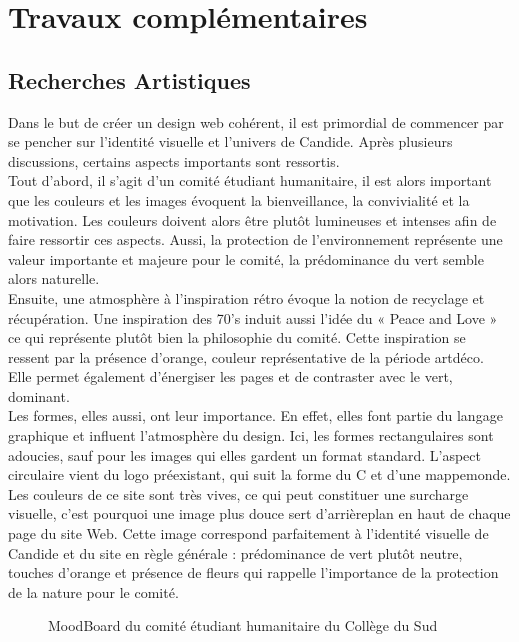 \documentclass[a4,10pt,french]{sphinxmanual}
\begin{document}
\section{Travaux complémentaires}
\label{\detokenize{chapitre-06:travaux-complementaires}}

\subsection{Recherches Artistiques}
\label{\detokenize{chapitre-06:recherches-artistiques}}
\sphinxAtStartPar
Dans le but de créer un design web cohérent, il est primordial de commencer par se pencher sur l’identité visuelle et l’univers de Candide. Après plusieurs discussions, certains aspects importants sont ressortis.\\
Tout d’abord, il s’agit d’un comité étudiant humanitaire, il est alors important que les couleurs et les images évoquent la bienveillance, la convivialité et la motivation. Les couleurs doivent alors être plutôt lumineuses et intenses afin de faire ressortir ces aspects. Aussi, la protection de l’environnement représente une valeur importante et majeure pour le comité, la prédominance du vert semble alors naturelle.\\
Ensuite, une atmosphère à l’inspiration rétro évoque la notion de recyclage et récupération. Une inspiration des 70’s induit aussi l’idée du « Peace and Love » ce qui représente plutôt bien la philosophie du comité. Cette inspiration se ressent par la présence d’orange, couleur représentative de la période art\sphinxhyphen{}déco. Elle permet également d’énergiser les pages et de contraster avec le vert, dominant.\\
Les formes, elles aussi, ont leur importance. En effet, elles font partie du langage graphique et influent l’atmosphère du design. Ici, les formes rectangulaires sont adoucies, sauf pour les images qui elles gardent un format standard. L’aspect circulaire vient du logo préexistant, qui suit la forme du C et d’une mappemonde.\\
Les couleurs de ce site sont très vives, ce qui peut constituer une surcharge visuelle, c’est pourquoi une image plus douce sert d’arrière\sphinxhyphen{}plan en haut de chaque page du site Web. Cette image correspond parfaitement à l’identité visuelle de Candide et du site en règle générale : prédominance de vert plutôt neutre, touches d’orange et présence de fleurs qui rappelle l’importance de la protection de la nature pour le comité.

\begin{figure}[htbp]
\centering
\capstart

\noindent{}
\caption{MoodBoard du comité étudiant humanitaire du Collège du Sud}\label{\detokenize{chapitre-06:id1}}\end{figure}
\end{document}
